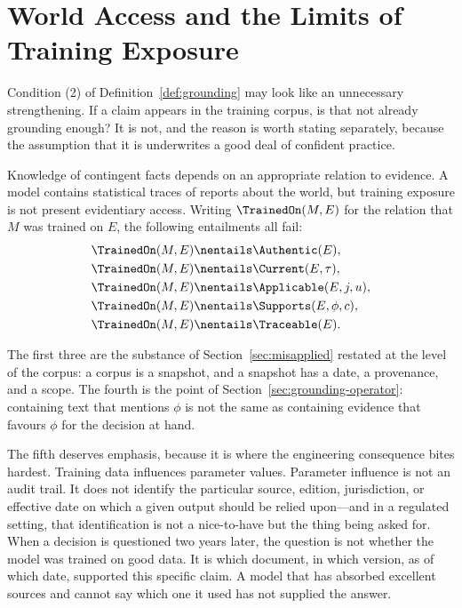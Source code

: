 \section{World Access and the Limits of Training Exposure}
\label{sec:world-access}

Condition (2) of Definition~\ref{def:grounding} may look like an unnecessary
strengthening. If a claim appears in the training corpus, is that not already
grounding enough? It is not, and the reason is worth stating separately, because
the assumption that it is underwrites a good deal of confident practice.

Knowledge of contingent facts depends on an appropriate relation to evidence. A
model contains statistical traces of reports about the world, but training
exposure is not present evidentiary access. Writing $\TrainedOn(M, E)$ for the
relation that $M$ was trained on $E$, the following entailments all fail:
\begin{align}
  \TrainedOn(M, E) &\nentails \Authentic(E), \label{eq:not-authentic}\\
  \TrainedOn(M, E) &\nentails \Current(E, \tau), \label{eq:not-current}\\
  \TrainedOn(M, E) &\nentails \Applicable(E, j, u), \label{eq:not-applicable}\\
  \TrainedOn(M, E) &\nentails \Supports(E, \phi, c), \label{eq:not-supports}\\
  \TrainedOn(M, E) &\nentails \Traceable(E). \label{eq:not-traceable}
\end{align}

The first three are the substance of Section~\ref{sec:misapplied} restated at the
level of the corpus: a corpus is a snapshot, and a snapshot has a date, a
provenance, and a scope. The fourth is the point of
Section~\ref{sec:grounding-operator}: containing text that mentions $\phi$ is not
the same as containing evidence that favours $\phi$ for the decision at hand.

The fifth deserves emphasis, because it is where the engineering consequence
bites hardest. Training data influences parameter values. Parameter influence is
not an audit trail. It does not identify the particular source, edition,
jurisdiction, or effective date on which a given output should be relied
upon---and in a regulated setting, that identification is not a nice-to-have but
the thing being asked for. When a decision is questioned two years later, the
question is not whether the model was trained on good data. It is which document,
in which version, as of which date, supported this specific claim. A model that
has absorbed excellent sources and cannot say which one it used has not supplied
the answer.

